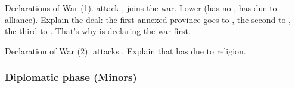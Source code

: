 \aparag Declarations of War (1).
\bparag \RUS attack \paysDon, \POL joins the war.
\bparag Lower \STAB (\RUS has no \CB, \POL has due to alliance).
\bparag Explain the deal: the first annexed province goes to \RUS, the second
to \paysUkraine, the third to \RUS. That's why \RUS is declaring the war
first.

\aparag Declaration of War (2).
\bparag \TUR attacks \paysGeorgie.
\bparag Explain that \TUR has \CB due to religion.

\subsubsection{Diplomatic phase (Minors)}


